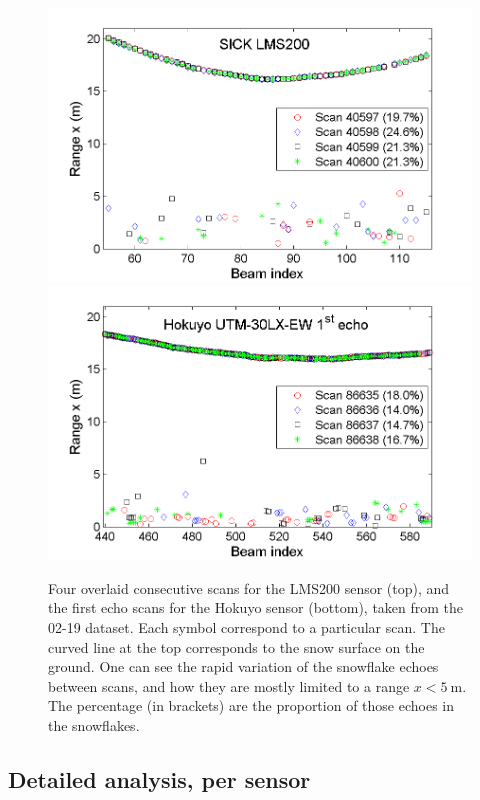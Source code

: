  \begin{figure}[th]
    \centering
    \includegraphics[width=0.95\linewidth]{./img/LMS200_4Scans_Feb19.png}
    \includegraphics[width=0.95\linewidth]{./img/Hokuyo_4Scans_Feb19.png}
    \caption{Four overlaid consecutive scans for the LMS200 sensor (top), and the first echo scans for the Hokuyo sensor (bottom), taken from the 02-19 dataset. Each symbol correspond to a particular scan. The curved line at the top corresponds to the snow surface on the ground. One can see the rapid variation of the snowflake echoes between scans, and how they are mostly limited to a range $x<\SI{5}{\meter}$. The percentage (in brackets) are the proportion of those echoes in the snowflakes. }
    \label{fig:LMS200_4Scans_Feb19}
\end{figure}

\subsection{Detailed analysis, per sensor}

